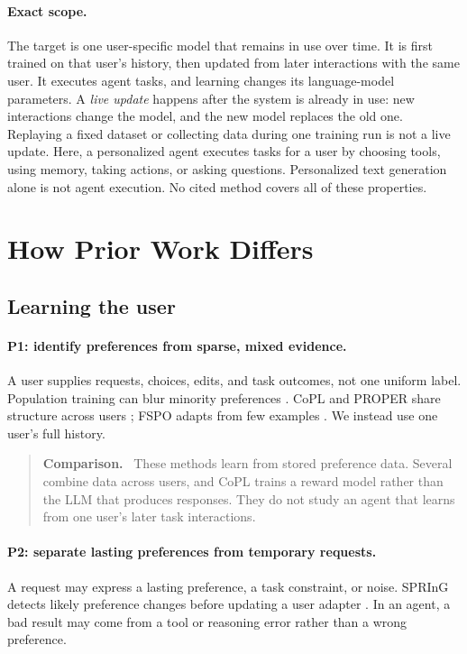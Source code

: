 \documentclass[11pt]{article}
\newenvironment{settingpointer}
  {\begin{quote}\small\noindent\textbf{Comparison.}\ }
  {\end{quote}}
\begin{document}
\paragraph{Exact scope.}
The target is one user-specific model that remains in use over time.  It is
first trained on that user's history, then updated from later interactions
with the same user.  It executes agent tasks, and learning changes its
language-model parameters.  A \emph{live update}
happens after the system is already in use: new interactions change the model,
and the new model replaces the old one.  Replaying a fixed dataset or
collecting data during one training run is not a live update.  Here, a
personalized agent executes tasks for a user by choosing tools, using memory,
taking actions, or asking questions.  Personalized text generation alone is
not agent execution.  No cited method covers all of these properties.

\section{How Prior Work Differs}
\label{sec:problems}

\subsection{Learning the user}

\paragraph{P1: identify preferences from sparse, mixed evidence.}
A user supplies requests, choices, edits, and task outcomes, not one uniform
label.  Population training can blur minority preferences
\citep{li2024personalized,jang2023personalizedsoups}.  CoPL and PROPER share
structure across users \citep{choi2025copl,zhang2025proper}; FSPO adapts from
few examples \citep{singh2025fspo}.  We instead use one user's full history.

\begin{settingpointer}
These methods learn from stored preference data.  Several combine data across
users, and CoPL trains a reward model rather than the LLM that produces
responses.  They do not study an agent that learns from one user's later task
interactions.
\end{settingpointer}

\paragraph{P2: separate lasting preferences from temporary requests.}
A request may express a lasting preference, a task constraint, or noise.
SPRInG detects likely preference changes before updating a user adapter
\citep{kim2026spring}.  In an agent, a bad result may come from a tool or
reasoning error rather than a wrong preference.
\end{document}
